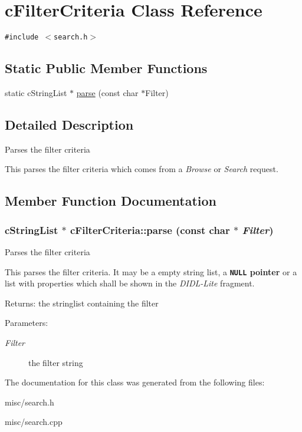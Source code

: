 \hypertarget{classcFilterCriteria}{
\section{cFilterCriteria Class Reference}
\label{classcFilterCriteria}
}
{\tt \#include $<$search.h$>$}

\subsection*{Static Public Member Functions}
\begin{CompactItemize}
\item 
static cStringList $\ast$ \hyperlink{classcFilterCriteria_e327772fdf9f8db127c7ce1a737f1c7c}{parse} (const char $\ast$Filter)
\end{CompactItemize}


\subsection{Detailed Description}
Parses the filter criteria

This parses the filter criteria which comes from a {\em Browse\/} or {\em Search\/} request. 

\subsection{Member Function Documentation}
\hypertarget{classcFilterCriteria_e327772fdf9f8db127c7ce1a737f1c7c}{
\subsubsection[{parse}]{\setlength{\rightskip}{0pt plus 5cm}cStringList $\ast$ cFilterCriteria::parse (const char $\ast$ {\em Filter})}}
\label{classcFilterCriteria_e327772fdf9f8db127c7ce1a737f1c7c}


Parses the filter criteria

This parses the filter criteria. It may be a empty string list, a {\bf {\tt NULL} pointer} or a list with properties which shall be shown in the {\em DIDL-Lite\/} fragment.

\begin{Desc}
\item[Returns:]the stringlist containing the filter \end{Desc}
\begin{Desc}
\item[Parameters:]
\begin{description}
\item[{\em Filter}]the filter string \end{description}
\end{Desc}


The documentation for this class was generated from the following files:\begin{CompactItemize}
\item 
misc/search.h\item 
misc/search.cpp\end{CompactItemize}
